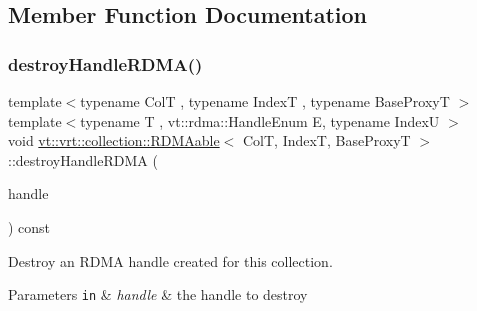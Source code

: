 \subsection{Member Function Documentation}
\mbox{\label{structvt_1_1vrt_1_1collection_1_1_r_d_m_aable_ab7b416ab8ea4643f17fde1e95ce4bea5}} 
\subsubsection{\texorpdfstring{destroy\+Handle\+R\+D\+M\+A()}{destroyHandleRDMA()}}
{\footnotesize\ttfamily template$<$typename ColT , typename IndexT , typename Base\+ProxyT $>$ \\
template$<$typename T , vt\+::rdma\+::\+Handle\+Enum E, typename IndexU $>$ \\
void \hyperlink{structvt_1_1vrt_1_1collection_1_1_r_d_m_aable}{vt\+::vrt\+::collection\+::\+R\+D\+M\+Aable}$<$ ColT, IndexT, Base\+ProxyT $>$\+::destroy\+Handle\+R\+D\+MA (\begin{DoxyParamCaption}\item[{\hyperlink{structvt_1_1rdma_1_1_handle}{vt\+::rdma\+::\+Handle}$<$ T, E, IndexU $>$}]{handle }\end{DoxyParamCaption}) const}



Destroy an R\+D\+MA handle created for this collection. 


\begin{DoxyParams}[1]{Parameters}
\mbox{\tt in}  & {\em handle} & the handle to destroy \\
\hline
\end{DoxyParams}
\mbox{\label{structvt_1_1vrt_1_1collection_1_1_r_d_m_aable_a220f2637cb911ba9cb7bbc1ee11d960f}} 
